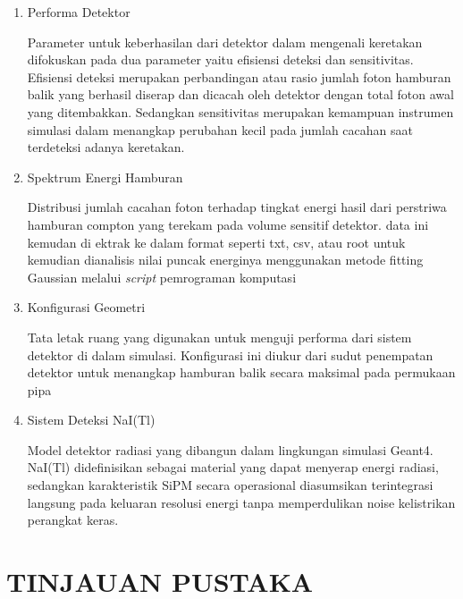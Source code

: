 \documentclass[12pt,a4paper]{report}
\begin{document}
\begin{enumerate}
    Kondisi cacat struktural materi pipa pada dinding pipa yang dmodelkan secara komputasi. Pada dasarnya keretakan ini dikondisikan dengan adanya celah ruang vakum dengan variasi dimensi  tertntu di dalam volume material pipa utuh

    \item Performa Detektor
    
    Parameter untuk keberhasilan dari detektor dalam mengenali keretakan difokuskan pada dua parameter yaitu efisiensi deteksi dan sensitivitas. Efisiensi deteksi merupakan perbandingan atau rasio jumlah foton hamburan balik yang berhasil diserap dan dicacah oleh detektor 
    dengan total foton awal yang ditembakkan. Sedangkan sensitivitas merupakan kemampuan instrumen simulasi dalam menangkap perubahan kecil pada jumlah cacahan saat terdeteksi adanya keretakan.

    \item Spektrum Energi Hamburan
    
    Distribusi jumlah cacahan foton terhadap tingkat energi hasil dari perstriwa hamburan compton yang terekam pada volume sensitif detektor. data ini kemudan di ektrak ke dalam format seperti txt, csv, atau root untuk kemudian dianalisis nilai puncak energinya menggunakan metode fitting Gaussian 
    melalui \textit{script} pemrograman komputasi

    \item Konfigurasi Geometri
    
    Tata letak ruang yang digunakan untuk menguji performa dari sistem detektor di dalam simulasi. Konfigurasi ini diukur dari sudut penempatan detektor untuk menangkap hamburan balik secara maksimal pada permukaan pipa

    \item Sistem Deteksi NaI(Tl)
    
    Model detektor radiasi yang dibangun dalam lingkungan simulasi Geant4. NaI(Tl) didefinisikan sebagai material yang dapat menyerap energi radiasi, sedangkan karakteristik SiPM secara operasional diasumsikan terintegrasi langsung pada keluaran resolusi energi tanpa memperdulikan noise kelistrikan perangkat keras.

\end{enumerate}
\chapter{TINJAUAN PUSTAKA}
\end{document}
